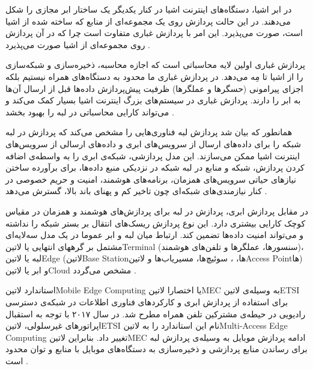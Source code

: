 
در ابر اشیا، دستگاه‌های اینترنت اشیا در کنار یکدیگر یک ساختار ابر مجازی را شکل می‌دهند. در این حالت پردازش روی یک مجموعه‌ای از منابع که ساخته شده از اشیا است، صورت می‌پذیرد.
این امر با پردازش غباری متفاوت است چرا که در آن پردازش روی مجموعه‌ای از اشیا صورت می‌پذیرد
.


پردازش غباری اولین لایه محاسباتی است که اجازه محاسبه، ذخیره‌سازی و شبکه‌سازی را از اشیا تا مِه می‌دهد. در پردازش غباری ما محدود به دستگاه‌های همراه نیستیم بلکه اجزای پیرامونی (حسگرها و عملگرها)
ظرفیت پیش‌پردازش داده‌ها قبل از ارسال آن‌ها به ابر را دارند. پردازش غباری در سیستم‌های بزرگ اینترنت اشیا بسیار کمک می‌کند و می‌تواند کارایی محاسباتی در لبه را بهبود بخشد
.


همانطور که بیان شد پردازش لبه فناوری‌هایی را مشخص می‌کند که پردازش در لبه شبکه را برای داده‌های ارسال از سرویس‌های ابری و داده‌های ارسالی از سرویس‌های اینترنت اشیا ممکن می‌سازند.
این مدل پردازشی، شبکه‌ی ابری را به واسطه‌ی اضافه کردن پردازش، شبکه و منابع در لبه شبکه در نزدیکی منبع داده‌ها، برای برآورده ساختن نیازهای حیاتی سرویس‌های همزمان، برنامه‌های هوشمند،
امنیت و حریم خصوصی در کنار نیازمندی‌های شبکه‌ای چون تاخیر کم و پهنای باند بالا، گسترش می‌دهد
.

در مقابل پردازش ابری، پردازش در لبه برای پردازش‌های هوشمند و همزمان در مقیاس کوچک کارایی بیشتری دارد. این نوع پردازش ریسک‌های انتقال بر بستر شبکه را نداشته و می‌تواند امنیت داده‌ها تضمین کند.
ارتباط میان لبه و ابر عموما در یک مدل سه‌لایه‌ای مشتمل بر گرههای انتهایی یا ‌لاتین{Terminal} (سنسورها، عملگرها و تلفن‌های هوشمند)،
لبه یا ‌لاتین{Edge} (‌لاتین{Base Station}ها، ، سوئیچ‌ها، مسیریاب‌ها و ‌لاتین{Access Point}ها)
و ابر یا ‌لاتین{Cloud} مشخص می‌گردد
.


استاندارد ‌لاتین{Mobile Edge Computing} یا اختصارا ‌لاتین{MEC} به وسیله‌ی ‌لاتین{ETSI} برای استفاده از پردازش ابری و کارکردهای فناوری اطلاعات در شبکه‌ی دسترسی رادیویی
در حیطه‌ی مشترکین تلفن همراه مطرح شد. در سال ۲۰۱۷ با توجه به استقبال اپراتورهای غیرسلولی، ‌لاتین{ETSI} نام این استاندارد را به ‌لاتین{Multi-Access Edge Computing}
تغییر داد. بنابراین ‌لاتین{MEC} ادامه پردازش موبایل به وسیله‌ی پردازش لبه برای رساندن منابع پردازشی و ذخیره‌سازی به دستگاه‌های موبایل با منابع و توان محدود است
.

